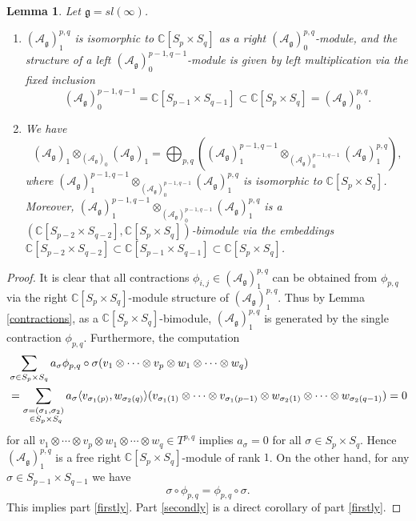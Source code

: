 \documentclass{amsart}
\renewcommand{\sl}{sl}
\renewcommand{\gg}{\mathfrak{g}}
\newcommand{\CC}{\mathbb{C}}
\newtheorem{lemma}[thm]{Lemma}
\theoremstyle{definition}
\numberwithin{equation}{section}
\begin{document}
\begin{lemma}\label{structure} Let  $\gg=\sl(\infty)$. 
\begin{enumerate}
\item \label{firstly} $(\mathcal  A_\gg)^{p,q}_1$ is isomorphic
  to $\mathbb C[S_p\times S_q]$ as a right $(\mathcal  A_\gg)^{p,q}_0$-module, and the structure of
 a left $(\mathcal A_\gg)^{p-1,q-1}_0$-module is given by
  left multiplication  via the fixed inclusion  
$$(\mathcal A_\gg)^{p-1,q-1}_0=\mathbb C[S_{p-1}\times S_{q-1}]\subset \mathbb C[S_p\times S_q]=(\mathcal  A_\gg)^{p,q}_0.$$
\item \label{secondly} We have
$$(\mathcal A_\gg)_1\otimes_{(\mathcal A_\gg)_0}(\mathcal A_\gg)_1=
\bigoplus_{p,q} ((\mathcal A_\gg)^{p-1,q-1}_1\otimes_{(\mathcal A_\gg)^{p-1,q-1}_0}(\mathcal A_\gg)^{p,q}_1),$$
where $(\mathcal A_\gg)^{p-1,q-1}_1\otimes_{(\mathcal A_\gg)^{p-1,q-1}_0}(\mathcal A_\gg)^{p,q}_1$
is isomorphic to $ \mathbb C[S_p\times S_q]$. Moreover, $(\mathcal A_\gg)^{p-1,q-1}_1\otimes_{(\mathcal A_\gg)^{p-1,q-1}_0}(\mathcal A_\gg)^{p,q}_1$ is a $ (\mathbb C[S_{p-2}\times S_{q-2}], \mathbb C[S_p\times S_q])$-bimodule via the embeddings $\CC[S_{p-2}\times S_{q-2}]\subset \CC[S_{p-1}\times S_{q-1}]\subset \CC[S_p\times S_q]$.
\end{enumerate}
\end{lemma}
\begin{proof}
It is clear that all contractions $\phi_{i,j} \in (\mathcal A_\gg)^{p,q}_1$ can be obtained from $\phi_{p,q}$ via the right $\mathbb C[S_p\times S_q]$-module structure of $(\mathcal A_\gg)^{p,q}_1$. Thus by Lemma \ref{contractions}, as a $\mathbb C[S_p\times S_q]$-bimodule,  $(\mathcal A_\gg)^{p,q}_1$ is generated by the single contraction
$\phi_{p,q}$. Furthermore, the computation 
\begin{align*}
&\sum_{\sigma \in S_p\times S_q}a_\sigma \phi_{p,q}\circ \sigma(v_1\otimes\cdots\otimes v_p\otimes w_1\otimes\cdots\otimes w_q)\\
& = \sum_{\substack{\sigma = (\sigma_1,\sigma_2) \\ \hspace{1ex} \in S_p\times S_q}}a_\sigma \langle v_{\sigma_1(p)},w_{\sigma_2(q)}\rangle
  (v_{\sigma_1(1)}\otimes\cdots\otimes v_{\sigma_1(p-1)}\otimes w_{\sigma_2(1)}\otimes\cdots\otimes w_{\sigma_2(q-1)})=0
\end{align*}
for all $v_1\otimes\cdots\otimes v_p\otimes w_1\otimes\cdots\otimes w_q\in T^{p,q}$
implies $a_\sigma=0$ for all $\sigma \in S_p\times S_q$.
Hence $(\mathcal A_\gg)^{p,q}_1$  is a free right $\mathbb C[S_p\times  S_q]$-module of rank $1$.
On the other hand, for any $\sigma \in S_{p-1}\times S_{q-1}$ we have
$$\sigma \circ \phi_{p,q}= \phi_{p,q}\circ \sigma.$$
This implies part \eqref{firstly}. Part \eqref{secondly} is a direct corollary of part \eqref{firstly}.
\end{proof}
\end{document}
